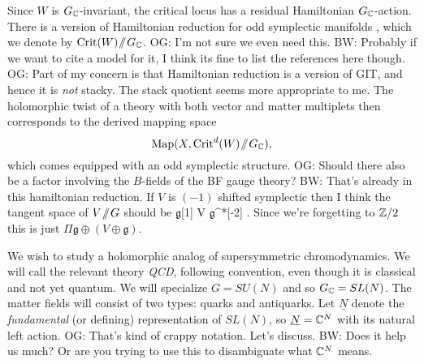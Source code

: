 \documentclass[11pt]{amsart}
\def\lie#1{\ensuremath{\mathfrak{#1}}}
\def\brian#1{{\textcolor{blue!65!red}{BW: {#1}}}}
\def\owen#1{{\textcolor{violet!65!black}{OG: {#1}}}}
\begin{document}
Since $W$ is $G_\mathbb C$-invariant, the critical locus has a residual Hamiltonian $G_\mathbb C$-action. 
There is a version of Hamiltonian reduction for odd symplectic manifolds \cite{Pavel, Kevin, who else},
which we denote by ${\rm Crit}(W) \!\sslash\! G_\mathbb C$. 
\owen{I'm not sure we even need this.} \brian{Probably if we want to cite a model for it, I think its fine to list the references here though.}
\owen{Part of my concern is that Hamiltonian reduction is a version of GIT, and hence it is {\em not} stacky. The stack quotient seems more appropriate to me.}
The holomorphic twist of a theory with both vector and matter multiplets then corresponds to the  derived mapping space
\[
{\rm Map}(X , {\rm Crit}^d(W) \!\sslash\! G_\mathbb C), 
\]
which comes equipped with an odd symplectic structure. 
\owen{Should there also be a factor involving the $B$-fields of the BF gauge theory?}
\brian{That's already in this hamiltonian reduction. 
If $V$ is $(-1)$ shifted symplectic then I think the tangent space of $V \!\sslash\! G$ should be
\beqn
\lie{g}[1] \oplus V \oplus \lie{g}^*[-2] .
\eeqn
Since we're forgetting to $\mathbb Z/2$ this is just $\Pi \lie{g} \oplus (V \oplus \lie{g})$.
}

We wish to study a holomorphic analog of supersymmetric chromodynamics.
We will call the relevant theory {\it QCD}, following convention, even though it is classical and not yet quantum.
We will specialize $G = SU(N)$ and so $G_\mathbb C = SL(N)$.
The matter fields will consist of two types: quarks and antiquarks.
Let $\underline{N}$ denote the {\em fundamental} (or defining) representation of $SL(N)$,
so $\underline{N} = \mathbb C^N$ with its natural left action.
\owen{That's kind of crappy notation. Let's discuss.}
\brian{Does it help us much? Or are you trying to use this to disambiguate what $\mathbb C^N$ means.}

\end{document}
